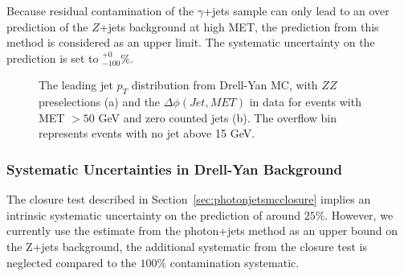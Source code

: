 Because residual contamination of the $\gamma$+jets sample can only lead to an over prediction
of the $Z$+jets background at high MET, the prediction from this method is considered
as an upper limit.  The systematic uncertainty on the prediction is set to $^{+0}_{-100}$\%.

\begin{figure}[!htbp]
\begin{center}
\caption{The leading jet $p_T$ distribution from Drell-Yan MC, with $ZZ$ preselections (a)
and the $\Delta\phi(Jet, MET)$ in data for events with MET $> 50$ GeV and zero counted jets (b).
The overflow bin represents events with no jet above 15 GeV.}
\label{fig:zjetsptmc}
\end{center}
\end{figure}

%
%
%
\subsubsection{Systematic Uncertainties in Drell-Yan Background}

The closure test described in Section~\ref{sec:photonjetsmcclosure}
implies an intrinsic systematic uncertainty on the prediction
of around $25\%$.
However, we currently use the estimate from the 
photon+jets method as an upper bound on the Z+jets background,
the additional systematic from the closure test is neglected compared 
to the $100\%$ contamination systematic.

